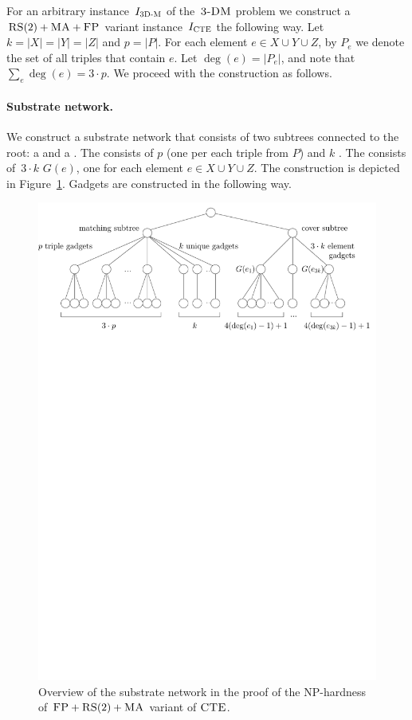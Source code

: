 For an arbitrary instance~$I_{\mathrm{\textsc{3D-M}}}$ of the~$\textsc{3-DM}$ problem we construct a~$\textsc{RS}(2)+\textsc{MA}+\textsc{FP}$ variant instance~$I_{\mathrm{\textsc{CTE}}}$ the following way.
Let $k = |X|=|Y|=|Z|$ and $p = |P|$.
For each element $e\in X\cup Y\cup Z$, by $P_e$ we denote the set of all triples that contain $e$.
Let $\deg(e) = |P_e|$, and note that $\sum_e \deg(e) = 3\cdot p$.
We proceed with the construction as follows.
\paragraph{Substrate network.}
We construct a substrate network that consists of two subtrees connected to the
  root: a \emph{\MatchSubtree} and a \emph{\CoverSubtree}. The
  {\MatchSubtree} consists of $p$ \emph{\TripleGadgets} (one per each triple from $P$) and $k$
  \emph{\UnqGadgets}. The {\CoverSubtree} consists of~$3\cdot k$ \emph{\ElGadgets} $G(e)$, one for each element $e\in X\cup Y\cup Z$.
  The construction is depicted in Figure~\ref{fig:red-ma2}. Gadgets are constructed in the following way.
\begin{figure}[t]
  \centering
  \includegraphics[width=0.9\columnwidth]{figs/static-mapping/overview}
  \caption{Overview of the substrate network in the proof of the NP-hardness of $\textsc{FP}+\textsc{RS}(2)+\textsc{MA}$ variant of $\textsc{CTE}$.}
  \label{fig:red-ma2}
\end{figure}

